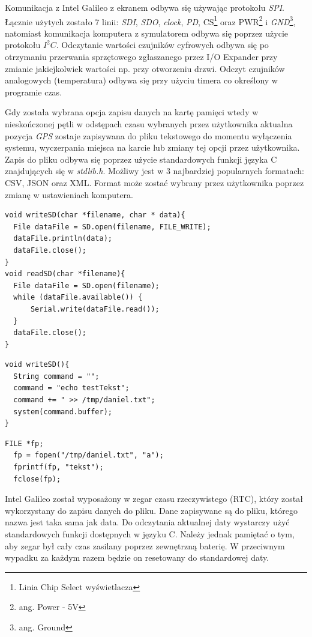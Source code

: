 \documentclass{xmgr}
\begin{document}
Komunikacja z Intel Galileo z ekranem odbywa się używając protokołu \emph{SPI}. Łącznie użytych zostało 7 linii: \emph{SDI}, \emph{SDO}, \emph{clock}, \emph{PD}, CS\footnote{Linia Chip Select wyświetlacza} oraz PWR\footnote{ang. Power - 5V} i \emph{GND}\footnote{ang. Ground}, natomiast komunikacja komputera z symulatorem odbywa się poprzez użycie protokołu $I^2C$. Odczytanie wartości czujników cyfrowych odbywa się po otrzymaniu przerwania sprzętowego zgłaszanego przez I/O Expander przy zmianie jakiejkolwiek wartości np. przy otworzeniu drzwi. Odczyt czujników analogowych (temperatura) odbywa się przy użyciu timera co określony w programie czas. 

Gdy została wybrana opcja zapisu danych na kartę pamięci wtedy w nieskończonej pętli w odstępach czasu wybranych przez użytkownika aktualna pozycja \emph{GPS} zostaje zapisywana do pliku tekstowego do momentu wyłączenia systemu, wyczerpania miejsca na karcie lub zmiany tej opcji przez użytkownika. Zapis do pliku odbywa się poprzez użycie standardowych funkcji języka C znajdujących się w \emph{stdlib.h}. Możliwy jest w 3 najbardziej popularnych formatach: CSV, JSON oraz XML. Format może zostać wybrany przez użytkownika poprzez zmianę w ustawieniach komputera.

\begin{lstlisting}[label=bot-dirs-alg,caption=Obsługa karty microSD za pomocą mechanizmu Arduino]
void writeSD(char *filename, char * data){
  File dataFile = SD.open(filename, FILE_WRITE);
  dataFile.println(data);
  dataFile.close();
}
void readSD(char *filename){
  File dataFile = SD.open(filename);
  while (dataFile.available()) {
      Serial.write(dataFile.read());
  }
  dataFile.close();
}
\end{lstlisting}

\begin{lstlisting}[label=bot-dirs-alg,caption=Obsługa karty microSD za pomocą mechanizmu systemu operacyjnego]
void writeSD(){
  String command = "";  
  command = "echo testTekst";
  command += " >> /tmp/daniel.txt";
  system(command.buffer);
}
\end{lstlisting}

\begin{lstlisting}[label=bot-dirs-alg,caption=Obsługa karty microSD za pomocą języka C]
  FILE *fp;
  fp = fopen("/tmp/daniel.txt", "a");
  fprintf(fp, "tekst");
  fclose(fp);
\end{lstlisting}

Intel Galileo został wyposażony w zegar czasu rzeczywistego (RTC), który został wykorzystany do zapisu danych do pliku. Dane zapisywane są do pliku, którego nazwa jest taka sama jak data. Do odczytania aktualnej daty wystarczy użyć standardowych funkcji dostępnych w języku C. Należy jednak pamiętać o tym, aby zegar był cały czas zasilany poprzez zewnętrzną baterię. W przeciwnym wypadku za każdym razem będzie on resetowany do standardowej daty.
\end{document}

